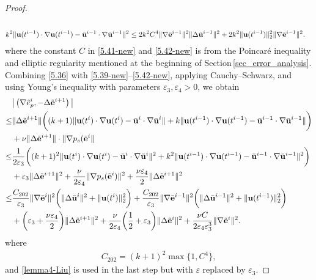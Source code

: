 \documentclass{article}
\theoremstyle{definition}                   %
\begin{document}
\begin{proof}
\begin{align}
  \label{5.41-new}  
  \\
k^2 \| {\bf{u}}(t^{i-1})\cdot\nabla{\bf{u}}(t^{i-1}) 
- \bar{\bf{u}}^{i-1} \cdot\nabla\bar{\bf{u}}^{i-1} \|^2
&\le 2k^2C^4 \| \nabla\bar{\bf{e}}^{i-1} \|^2 
    \|\Delta \bar{\bf{u}}^{i-1} \|^2 
  + 2k^2 \| {\bf{u}}(t^{i-1})\|^2_2  
      \| \nabla\bar{\bf{e}}^{i-1} \|^2.
  \label{5.42-new}  
\end{align}
where the constant $C$ in \eqref{5.41-new} and \eqref{5.42-new} is from the Poincar\'{e} inequality and elliptic regularity mentioned at the beginning of Section\,\ref{sec_error_analysis}.
%
%
Combining \eqref{5.36} with \eqref{5.39-new}--\eqref{5.42-new}, applying
Cauchy--Schwarz, and using Young's inequality with parameters
$\varepsilon_3,\varepsilon_4>0$, we obtain
\begin{align}
&\big|\left( \nabla \hat{e}^i_p, -\Delta \tilde{\bf{e}}^{i+1} \right)\big|  \\
\le & \|\Delta\tilde{\bf{e}}^{i+1}\|
\bigg( (k+1) \|{\bf{u}}(t^i)\cdot\nabla{\bf{u}}(t^i)
           -\bar{\bf{u}}^i\cdot\nabla\bar{\bf{u}}^i \|
  + k \|{\bf{u}}(t^{i-1})\cdot\nabla{\bf{u}}(t^{i-1})
           -\bar{\bf{u}}^{i-1}\cdot\nabla\bar{\bf{u}}^{i-1} \| \bigg)    
\notag\\     
& + \nu \|\Delta\tilde{\bf{e}}^{i+1} \| 
     \cdot \|\nabla p_s(\tilde{\bf{e}}^i \|
\notag\\
\le &  \frac{1}{2\varepsilon_3} \bigg( 
   (k+1)^2 \|{\bf{u}}(t^i)\cdot\nabla{\bf{u}}(t^i)
    -\bar{\bf{u}}^i\cdot\nabla\bar{\bf{u}}^i \|^2
  + k^2 \|{\bf{u}}(t^{i-1})\cdot\nabla{\bf{u}}(t^{i-1})
     -\bar{\bf{u}}^{i-1}\cdot\nabla\bar{\bf{u}}^{i-1} \|^2 \bigg)       
\notag\\
& + \varepsilon_3 \|\Delta\tilde{\bf{e}}^{i+1} \|^2 
+ \frac{\nu}{2\varepsilon_4} \|\nabla p_s(\tilde{\bf{e}}^i)\|^2
+ \frac{\nu \varepsilon_4}{2} \|\Delta\tilde{\bf{e}}^{i+1} \|^2
\notag \\
\le & \frac{C_{202}}{\varepsilon_3} \|\nabla\bar{\bf{e}}^i\|^2 
\bigg( \|\Delta\bar{\bf{u}}^i \|^2 
      + \|{\bf{u}}(t^i)\|^2_2 \bigg) 
+ \frac{C_{202}}{\varepsilon_3}
  \|\nabla\bar{\bf{e}}^{i-1}\|^2 
\bigg( \|\Delta\bar{\bf{u}}^{i-1} \|^2 
      + \|{\bf{u}}(t^{i-1})\|^2_2 \bigg) 
\notag\\
& + \bigg( \varepsilon_3 + \frac{\nu\varepsilon_4}{2} \bigg)
    \|\Delta\tilde{\bf{e}}^{i+1}\|^2
    + \frac{\nu}{2\varepsilon_4} \bigg( \frac{1}{2} + \varepsilon_3 \bigg) \|\Delta\tilde{\bf{e}}^i \|^2
    +   \frac{\nu C}{2\varepsilon_4\varepsilon_3^3}  \|\nabla\tilde{\bf{e}}^i\|^2. 
\label{5.43-new}         
\end{align}
where 
\begin{align}
C_{202}=(k+1)^2 \max\{1, C^4 \},
\label{def_C202}
\end{align}
and  \eqref{lemma4-Liu} is used in the last step  but with $\varepsilon$ replaced by $\varepsilon_3$.



\end{proof}
\end{document}
